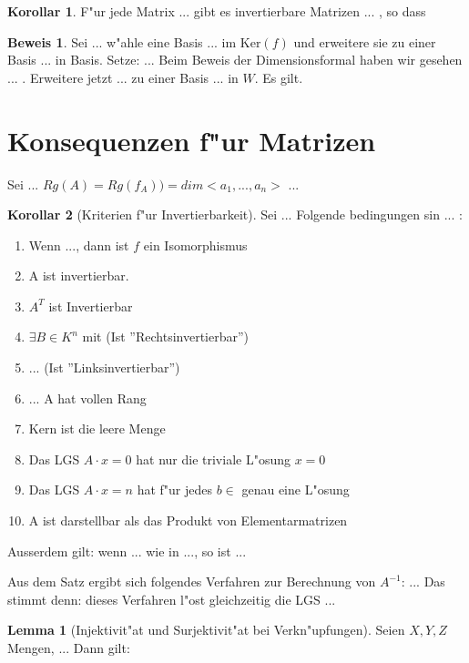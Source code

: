 \documentclass[oneside,fontsize=11pt,paper=a4,BCOR=0mm,DIV=12,automark,headsepline]{scrbook}
\theoremstyle{remark}
\theoremstyle{definition}
\newtheorem{lemma}{Lemma}[section]
\newtheorem*{korollar}{Korollar}
\theoremstyle{definition}
\newtheorem*{prof}{Beweis}
\theoremstyle{remark}
\begin{document}
\begin{korollar}
  F"ur jede Matrix ... gibt es invertierbare Matrizen ... , so dass
\end{korollar}

\begin{prof}
  Sei ... w"ahle eine Basis ... im $\text{Ker}(f)$  und erweitere sie zu einer
  Basis ... in Basis. Setze: ... Beim Beweis der Dimensionsformal haben wir
  gesehen ... . Erweitere jetzt ... zu einer Basis ... in $W$. Es gilt. 
\end{prof}

\section{Konsequenzen f"ur Matrizen}
\label{sec:konsma}

Sei ...
$Rg(A)=Rg(f_A))=dim<a_1,...,a_n>$ ...

\begin{korollar}[Kriterien f"ur Invertierbarkeit]
  Sei ... Folgende bedingungen sin ... :
  \begin{enumerate}
  \item Wenn ..., dann ist $f$ ein Isomorphismus
  \item A ist invertierbar.
  \item $A^T$ ist Invertierbar
  \item $\exists B\in K^n$ mit (Ist ''Rechtsinvertierbar'')
  \item ... (Ist ''Linksinvertierbar'')
  \item ... A hat vollen Rang
  \item Kern ist die leere Menge
  \item Das LGS $A\cdot x = 0$ hat nur die triviale L"osung $x=0$
  \item Das LGS $A\cdot x = n$ hat f"ur jedes $b\in $ genau eine L"osung
  \item A ist darstellbar als das Produkt von Elementarmatrizen
  \end{enumerate}

  Ausserdem gilt: wenn ... wie in ..., so ist ... 
\end{korollar}

Aus dem Satz ergibt sich folgendes Verfahren zur Berechnung von $A^{-1}$: ...
Das stimmt denn: dieses Verfahren l"ost gleichzeitig die LGS ...

\begin{lemma}[Injektivit"at und Surjektivit"at bei Verkn"upfungen]
  Seien $X,Y,Z$ Mengen, ... Dann gilt:  
\end{lemma}
\end{document}
